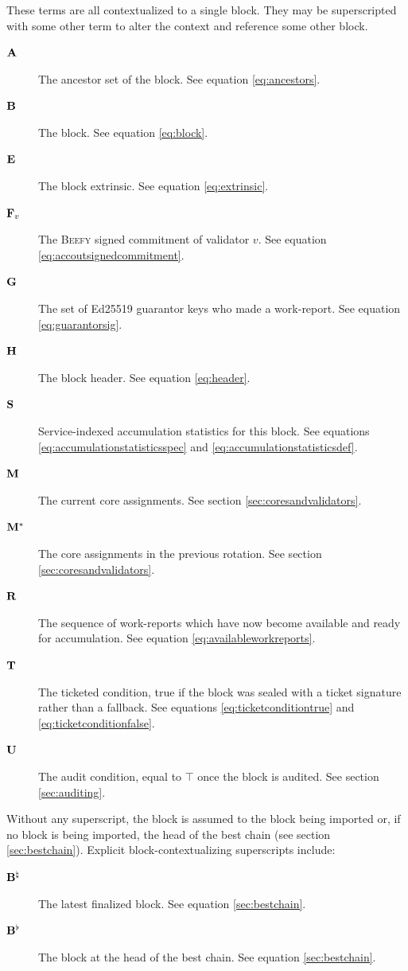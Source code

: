 These terms are all contextualized to a single block. They may be superscripted with some other term to alter the context and reference some other block.
\begin{description}
  \item[$\mathbf{A}$] The ancestor set of the block. See equation \ref{eq:ancestors}.
  \item[$\mathbf{B}$] The block. See equation \ref{eq:block}.
  \item[$\mathbf{E}$] The block extrinsic. See equation \ref{eq:extrinsic}.
  \item[$\mathbf{F}_{v}$] The \textsc{Beefy} signed commitment of validator $v$. See equation \ref{eq:accoutsignedcommitment}.
  \item[$\mathbf{G}$] The set of Ed25519 guarantor keys who made a work-report. See equation \ref{eq:guarantorsig}.
  \item[$\mathbf{H}$] The block header. See equation \ref{eq:header}.
  \item[$\mathbf{S}$] Service-indexed accumulation statistics for this block. See equations \ref{eq:accumulationstatisticsspec} and \ref{eq:accumulationstatisticsdef}.
  \item[$\mathbf{M}$] The current core assignments. See section \ref{sec:coresandvalidators}.
  \item[$\mathbf{M}^*$] The core assignments in the previous rotation. See section \ref{sec:coresandvalidators}.
  \item[$\mathbf{R}$] The sequence of work-reports which have now become available and ready for accumulation. See equation \ref{eq:availableworkreports}.
  \item[$\mathbf{T}$] The ticketed condition, true if the block was sealed with a ticket signature rather than a fallback. See equations \ref{eq:ticketconditiontrue} and \ref{eq:ticketconditionfalse}.
  \item[$\mathbf{U}$] The audit condition, equal to $\top$ once the block is audited. See section \ref{sec:auditing}.
\end{description}

Without any superscript, the block is assumed to the block being imported or, if no block is being imported, the head of the best chain (see section \ref{sec:bestchain}). Explicit block-contextualizing superscripts include:
\begin{description}
  \item[$\mathbf{B}^\natural$] The latest finalized block. See equation \ref{sec:bestchain}.
  \item[$\mathbf{B}^\flat$] The block at the head of the best chain. See equation \ref{sec:bestchain}.
\end{description}

